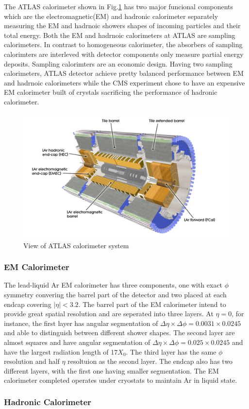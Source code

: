 \label{sec:detector-calo}

The ATLAS calorimeter shown in Fig.\ref{fig:detector-calo} has two major funcional components which are the electromagnetic(EM) and hadronic calorimeter separately measuring the EM and hadrnoic showers shapes of incoming particles and their total energy. Both the EM and hadrnoic calorimeters at ATLAS are sampling calorimeters. In contrast to homogeneous calorimeter, the absorbers of sampling calorimters are interleved with detector components only measure partial energy deposits. Sampling calorimters are an economic design. Having two sampling calorimeters, ATLAS detector achieve pretty balanced performance between EM and hadrnoic calorimeters while the CMS experiment chose to have an expensive EM calorimeter built of crystals sacrificing the performance of hadronic calorimeter. 


\begin{figure}[htpb!]
\begin{center}
  \includegraphics[width=0.9\linewidth]{figures/detector/calo}
\caption{View of ATLAS calorimeter system}
\label{fig:detector-calo}
\end{center}
\end{figure}


\subsubsection{EM Calorimeter}

The lead-liquid Ar EM calorimeter has three components, one with exact $\phi$ symmetry convering the barrel part of the detector and two placed at each endcap covering $|\eta|<3.2$. The barrel part of the EM calorimeter intend to provide great spatial resolution and are seperated into three layers. At $\eta =0$, for instance, the first layer has angular segmentation of $\Delta \eta \times \Delta \phi = 0.0031 \times 0.0245$ and able to distinguish between different shower shapes. The second layer are almost squares and have angular segmentation of $\Delta \eta \times \Delta \phi = 0.025 \times 0.0245$ and have the largest radiation length of 17$X_0$. The third layer has the same $\phi$ resolution and half $\eta$ resoltuion as the second layer. The endcap also has two different layers, with the first one having smaller segmentation. The EM calorimeter completed operates under cryostats to maintain Ar in liquid state.

\subsubsection{Hadronic Calorimeter}





